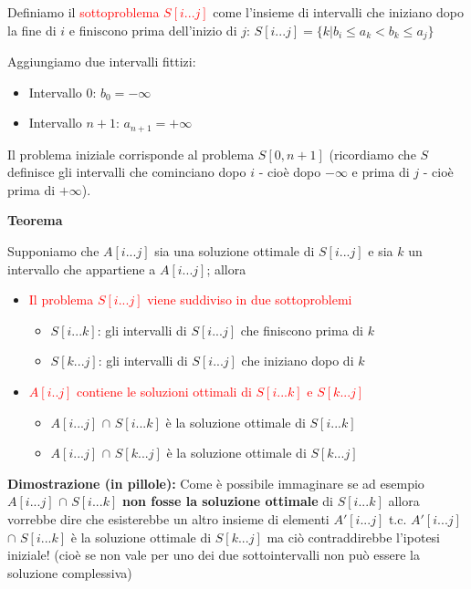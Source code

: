 \documentclass[../cheatSheetAlgoritmi.tex]{subfiles}
\begin{document}
Definiamo il \textcolor{red}{sottoproblema $S[i...j]$} come l'insieme di intervalli che iniziano dopo la fine di $i$ e finiscono prima dell'inizio di $j$: $S[i...j] = \{k|b_i \leq a_k < b_k \leq a_j\}$

Aggiungiamo due intervalli fittizi:

\begin{itemize}
	\item  Intervallo 0: $b_0 = - \infty$ 
	\item  Intervallo $n+1$: $a_{n+1} = + \infty$ 
\end{itemize}
Il problema iniziale corrisponde al problema $S[0,n+1]$ (ricordiamo che $S$ definisce gli intervalli che cominciano dopo $i$ - cioè dopo $- \infty$ e prima di $j$ - cioè prima di $+ \infty$).
\newpage
\begin{flushleft}
\textbf{Teorema}
\end{flushleft}
Supponiamo che $A[i...j]$ sia una soluzione ottimale di $S[i...j]$ e sia $k$ un intervallo che appartiene a $A[i...j]$; allora
\begin{itemize}
	\item  \textcolor{red}{Il problema $S[i...j]$ viene suddiviso in due sottoproblemi}
		\begin{itemize}
			\item  $S[i...k]$: gli intervalli di $S[i...j]$ che finiscono prima di $k$
			\item  $S[k...j]$: gli intervalli di $S[i...j]$ che iniziano dopo di $k$ 
		\end{itemize}
	\item  \textcolor{red}{$A[i..j]$ contiene le soluzioni ottimali di $S[i...k]$ e $S[k...j]$} 
		\begin{itemize}
			\item  $A[i...j]$ $\cap$ $S[i...k]$ è la soluzione ottimale di $S[i...k]$
			\item  $A[i...j]$ $\cap$ $S[k...j]$ è la soluzione ottimale di $S[k...j]$
		\end{itemize}
\end{itemize}
\textbf{Dimostrazione (in pillole):} Come è possibile immaginare se ad esempio $A[i...j]$ $\cap$ $S[i...k]$ \textbf{non fosse la soluzione ottimale} di $S[i...k]$ allora vorrebbe dire che esisterebbe un altro insieme di elementi $A'[i...j]$ t.c. $A'[i...j]$ $\cap$ $S[i...k]$ è la soluzione ottimale di $S[k...j]$ ma ciò contraddirebbe l'ipotesi iniziale! (cioè se non vale per uno dei due sottointervalli non può essere la soluzione complessiva)
\end{document}
